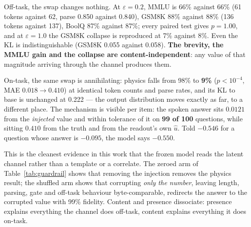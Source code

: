 \documentclass[11pt]{article}
\begin{document}
Off-task, the swap changes nothing. At $\varepsilon = 0.2$, MMLU is 66\% against 66\% (61 tokens against 62, parse 0.850 against 0.840), GSM8K 88\% against 88\% (136 tokens against 137), BoolQ 87\% against 87\%; every paired test gives $p = 1.00$, and at $\varepsilon = 1.0$ the GSM8K collapse is reproduced at 7\% against 8\%. Even the KL is indistinguishable (GSM8K 0.055 against 0.058). \textbf{The brevity, the MMLU gain and the collapse are content-independent}: any value of that magnitude arriving through the channel produces them.

On-task, the same swap is annihilating: physics falls from 98\% to \textbf{9\%} ($p < 10^{-4}$, MAE $0.018 \to 0.410$) at identical token counts and parse rates, and its KL to base is unchanged at 0.222 --- the output distribution moves exactly as far, to a different place. The mechanism is visible per item: the spoken answer sits $0.0121$ from the \emph{injected} value and within tolerance of it on \textbf{99 of 100} questions, while sitting $0.410$ from the truth and from the readout's own $\hat u$. Told $-0.546$ for a question whose answer is $-0.095$, the model says $-0.550$.

This is the cleanest evidence in this work that the frozen model reads the latent channel rather than a template or a correlate. The zeroed arm of Table~\ref{tab:guardrail} shows that removing the injection removes the physics result; the shuffled arm shows that corrupting \emph{only the number}, leaving length, parsing, gate and off-task behaviour byte-comparable, redirects the answer to the corrupted value with 99\% fidelity. Content and presence dissociate: presence explains everything the channel does off-task, content explains everything it does on-task.
\end{document}
